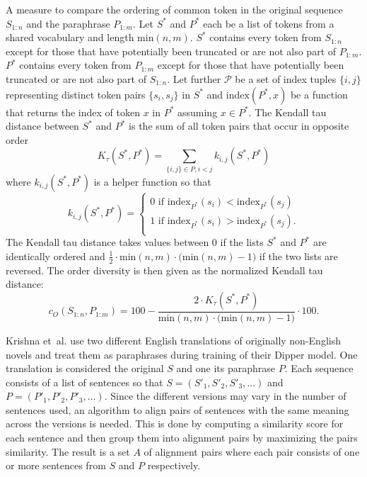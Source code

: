     \begin{definition}
    \label{def:co}
        A measure to compare the ordering of common token in the original sequence $S_{1:n}$ and the paraphrase $P_{1:m}$.
        Let $S^*$ and $P^*$ each be a list of tokens from a shared vocabulary and length $\text{min}(n,m)$.
        $S^*$ contains every token from $S_{1:n}$ except for those that have potentially been truncated or are not also part of $P_{1:m}$.
        $P^*$ contains every token from $P_{1:m}$ except for those that have potentially been truncated or are not also part of $S_{1:n}$.
        Let further $\mathcal{P}$ be a set of index tuples $\{i,j\}$ representing distinct token pairs $\{s_i, s_j\}$ in $S^*$ and $\text{index}(P^*,x)$ be a function that returns the index of token $x$ in $P^*$ assuming $x \in P^*$.
        The Kendall tau distance between $S^*$ and $P^*$ is the sum of all token pairs that occur in opposite order
        \begin{equation}
            K_{\tau}(S^*, P^*) = \sum_{\{i,j\} \in P, i < j} k_{i,j}(S^*,P^*)
        \end{equation}
        where $k_{i,j}(S^*,P^*)$ is a helper function so that
        \begin{equation}
            k_{i,j}(S^*,P^*) =  
            \begin{cases}
                0 \text{ if } \text{index}_{P^*}(s_i) < \text{index}_{P^*}(s_j) \\
                1 \text{ if } \text{index}_{P^*}(s_i) > \text{index}_{P^*}(s_j) \text{.} \\
            \end{cases}
        \end{equation}
        The Kendall tau distance takes values between $0$ if the lists $S^*$ and $P^*$ are identically ordered and $\frac{1}{2} \cdot \text{min}(n,m) \cdot \big( \text{min}(n,m)-1 \big)$ if the two lists are reversed.
        The order diversity is then given as the normalized Kendall tau distance:
        \begin{equation}
            c_O(S_{1:n},P_{1:m}) = 100 - \frac{2 \cdot K_{\tau}(S^*, P^*)}{\text{min}(n,m) \cdot \big( \text{min}(n,m) - 1 \big)} \cdot 100 \text{.}
        \end{equation}
    \end{definition}

    Krishna et~al. \cite{krishna2023paraphrasing} use two different English translations of originally non-English novels and treat them as paraphrases during training of their Dipper model.
    One translation is considered the original $S$ and one its paraphrase $P$.
    Each sequence consists of a list of sentences so that $S = (S'_1, S'_2, S'_3, \dots)$ and $P = (P'_1, P'_2, P'_3, \dots)$. 
    Since the different versions may vary in the number of sentences used, an algorithm to align pairs of sentences with the same meaning across the versions is needed.
    This is done by computing a similarity score for each sentence and then group them into alignment pairs by maximizing the pairs similarity.
    The result is a set $A$ of alignment pairs where each pair consists of one or more sentences from $S$ and $P$ respectively.

